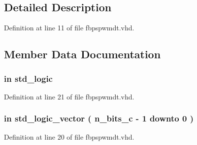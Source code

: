 \subsection{Detailed Description}


Definition at line 11 of file fbpspwmdt.\+vhd.



\subsection{Member Data Documentation}
\hypertarget{classfbpspwmdt_af9b8278b961604ab62a822537a109adb}{}
\subsubsection[{amost}]{ {\bfseries \textcolor{keywordflow}{in}\textcolor{vhdlchar}{ }} {\bfseries \textcolor{comment}{std\+\_\+logic}\textcolor{vhdlchar}{ }} \hspace{0.3cm}{\ttfamily [Port]}}\label{classfbpspwmdt_af9b8278b961604ab62a822537a109adb}


Definition at line 21 of file fbpspwmdt.\+vhd.

\hypertarget{classfbpspwmdt_a0808bf3e7965a8ee90dec6604647f179}{}
\subsubsection[{c}]{ {\bfseries \textcolor{keywordflow}{in}\textcolor{vhdlchar}{ }} {\bfseries \textcolor{comment}{std\+\_\+logic\+\_\+vector}\textcolor{vhdlchar}{ }\textcolor{vhdlchar}{(}\textcolor{vhdlchar}{ }\textcolor{vhdlchar}{ }\textcolor{vhdlchar}{ }\textcolor{vhdlchar}{ }{\bfseries {\bf n\+\_\+bits\+\_\+c}} \textcolor{vhdlchar}{-\/}\textcolor{vhdlchar}{ } \textcolor{vhdldigit}{1} \textcolor{vhdlchar}{ }\textcolor{keywordflow}{downto}\textcolor{vhdlchar}{ }\textcolor{vhdlchar}{ } \textcolor{vhdldigit}{0} \textcolor{vhdlchar}{ }\textcolor{vhdlchar}{)}\textcolor{vhdlchar}{ }} \hspace{0.3cm}{\ttfamily [Port]}}\label{classfbpspwmdt_a0808bf3e7965a8ee90dec6604647f179}


Definition at line 20 of file fbpspwmdt.\+vhd.

\hypertarget{classfbpspwmdt_a66678837c93def3337995d7ffcb44f3f}{}
